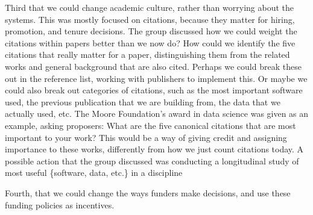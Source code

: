 \documentclass[11pt, oneside]{amsart}
\begin{document}
Third that we could change academic culture, rather than worrying about the systems.
This was mostly focused on citations, because they matter for hiring, promotion,
and tenure decisions.  The group discussed how we could weight the citations
within papers better than we now do? How could we identify the five citations
that really matter for a paper, distinguishing them from the related works and
general background that are also cited.  Perhaps we could break these out in
the reference list, working with publishers to implement this.  Or maybe we
could also break out categories of citations, such as the most important software used,
the previous publication that we are building from, the data that we actually used, etc.
The Moore Foundation's award in data science was given as an example, asking
proposers: What are the five canonical citations that are most important to your work?
This would be a way of giving credit and assigning importance to these works,
differently from how we just count citations today.  A possible action that the group
discussed was conducting a longitudinal study of most useful \{software, data, etc.\}
in a discipline

Fourth, that we could change the ways funders make decisions, and use these funding
policies as incentives.
\end{document}
